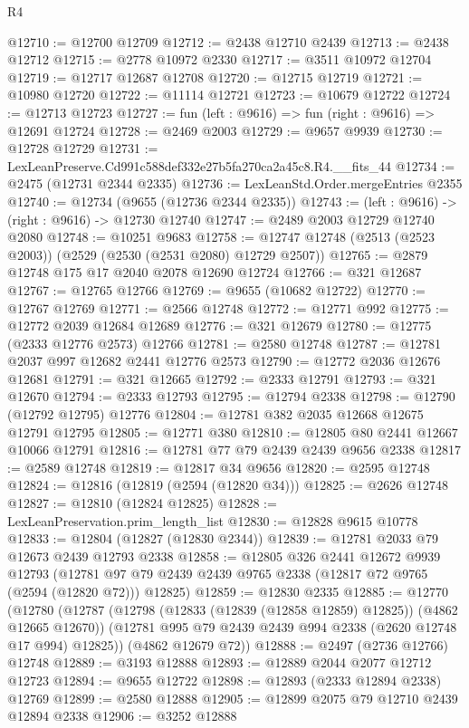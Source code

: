 \begin{lexlean}{R4}
\begin{coremodule}
@12710 := @12700 @12709
@12712 := @2438 @12710 @2439
@12713 := @2438 @12712
@12715 := @2778 @10972 @2330
@12717 := @3511 @10972 @12704
@12719 := @12717 @12687 @12708
@12720 := @12715 @12719
@12721 := @10980 @12720
@12722 := @11114 @12721
@12723 := @10679 @12722
@12724 := @12713 @12723
@12727 := fun (left : @9616) => fun (right : @9616) => @12691 @12724
@12728 := @2469 @2003
@12729 := @9657 @9939
@12730 := @12728 @12729
@12731 := LexLeanPreserve.Cd991c588def332e27b5fa270ca2a45c8.R4.__fits_44
@12734 := @2475 (@12731 @2344 @2335)
@12736 := LexLeanStd.Order.mergeEntries @2355
@12740 := @12734 (@9655 (@12736 @2344 @2335))
@12743 := (left : @9616) -> (right : @9616) -> @12730 @12740
@12747 := @2489 @2003 @12729 @12740 @2080
@12748 := @10251 @9683
@12758 := @12747 @12748 (@2513 (@2523 @2003)) (@2529 (@2530 (@2531 @2080) @12729 @2507))
@12765 := @2879 @12748 @175 @17 @2040 @2078 @12690 @12724
@12766 := @321 @12687
@12767 := @12765 @12766
@12769 := @9655 (@10682 @12722)
@12770 := @12767 @12769
@12771 := @2566 @12748
@12772 := @12771 @992
@12775 := @12772 @2039 @12684 @12689
@12776 := @321 @12679
@12780 := @12775 (@2333 @12776 @2573) @12766
@12781 := @2580 @12748
@12787 := @12781 @2037 @997 @12682 @2441 @12776 @2573
@12790 := @12772 @2036 @12676 @12681
@12791 := @321 @12665
@12792 := @2333 @12791
@12793 := @321 @12670
@12794 := @2333 @12793
@12795 := @12794 @2338
@12798 := @12790 (@12792 @12795) @12776
@12804 := @12781 @382 @2035 @12668 @12675 @12791 @12795
@12805 := @12771 @380
@12810 := @12805 @80 @2441 @12667 @10066 @12791
@12816 := @12781 @77 @79 @2439 @2439 @9656 @2338
@12817 := @2589 @12748
@12819 := @12817 @34 @9656
@12820 := @2595 @12748
@12824 := @12816 (@12819 (@2594 (@12820 @34)))
@12825 := @2626 @12748
@12827 := @12810 (@12824 @12825)
@12828 := LexLeanPreservation.prim_length_list
@12830 := @12828 @9615 @10778
@12833 := @12804 (@12827 (@12830 @2344))
@12839 := @12781 @2033 @79 @12673 @2439 @12793 @2338
@12858 := @12805
    @326
    @2441
    @12672
    @9939
    @12793
    (@12781 @97 @79 @2439 @2439 @9765 @2338 (@12817 @72 @9765 (@2594 (@12820 @72))) @12825)
@12859 := @12830 @2335
@12885 := @12770
    (@12780
      (@12787
        (@12798 (@12833 (@12839 (@12858 @12859) @12825)) (@4862 @12665 @12670))
        (@12781 @995 @79 @2439 @2439 @994 @2338 (@2620 @12748 @17 @994) @12825))
      (@4862 @12679 @72))
@12888 := @2497 (@2736 @12766) @12748
@12889 := @3193 @12888
@12893 := @12889 @2044 @2077 @12712 @12723
@12894 := @9655 @12722
@12898 := @12893 (@2333 @12894 @2338) @12769
@12899 := @2580 @12888
@12905 := @12899 @2075 @79 @12710 @2439 @12894 @2338
@12906 := @3252 @12888

\end{coremodule}
\end{lexlean}
